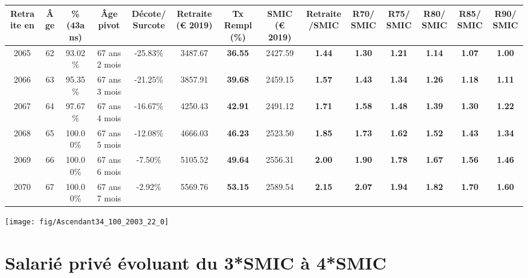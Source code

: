 \begin{adjustbox}{max width=\textwidth} 
\begin{tabular}[htb]{|c|c||c|c|c||c|c||c|c||c|c|c|c|c|} 
\hline 
 Retraite en &  Âge &  \%(43ans) &  Âge pivot &  Décote/Surcote &  Retraite (\euro{} 2019) &  Tx Rempl(\%) &  SMIC (\euro{} 2019) &  Retraite/SMIC &  R70/SMIC &  R75/SMIC &  R80/SMIC &  R85/SMIC &  R90/SMIC \\ 
\hline \hline 
 2065 &  62 &  93.02\% &  67 ans 2 mois &  -25.83\% &  3487.67 &  {\bf 36.55} &  2427.59 &  {\bf 1.44} &  {\bf 1.30} &  {\bf 1.21} &  {\bf 1.14} &  {\bf 1.07} &  {\bf 1.00} \\ 
\hline 
 2066 &  63 &  95.35\% &  67 ans 3 mois &  -21.25\% &  3857.91 &  {\bf 39.68} &  2459.15 &  {\bf 1.57} &  {\bf 1.43} &  {\bf 1.34} &  {\bf 1.26} &  {\bf 1.18} &  {\bf 1.11} \\ 
\hline 
 2067 &  64 &  97.67\% &  67 ans 4 mois &  -16.67\% &  4250.43 &  {\bf 42.91} &  2491.12 &  {\bf 1.71} &  {\bf 1.58} &  {\bf 1.48} &  {\bf 1.39} &  {\bf 1.30} &  {\bf 1.22} \\ 
\hline 
 2068 &  65 &  100.00\% &  67 ans 5 mois &  -12.08\% &  4666.03 &  {\bf 46.23} &  2523.50 &  {\bf 1.85} &  {\bf 1.73} &  {\bf 1.62} &  {\bf 1.52} &  {\bf 1.43} &  {\bf 1.34} \\ 
\hline 
 2069 &  66 &  100.00\% &  67 ans 6 mois &  -7.50\% &  5105.52 &  {\bf 49.64} &  2556.31 &  {\bf 2.00} &  {\bf 1.90} &  {\bf 1.78} &  {\bf 1.67} &  {\bf 1.56} &  {\bf 1.46} \\ 
\hline 
 2070 &  67 &  100.00\% &  67 ans 7 mois &  -2.92\% &  5569.76 &  {\bf 53.15} &  2589.54 &  {\bf 2.15} &  {\bf 2.07} &  {\bf 1.94} &  {\bf 1.82} &  {\bf 1.70} &  {\bf 1.60} \\ 
\hline 
\hline 
\end{tabular} 
\end{adjustbox} 
 
 \vspace{0.1cm} 

 {\hspace{-2.2cm}\texttt{[image: fig/Ascendant34\_100\_2003\_22\_0]}} 

\newpage 
 
\chapter{Salarié privé évoluant du 3*SMIC à 4*SMIC} 

~\\ 
 
